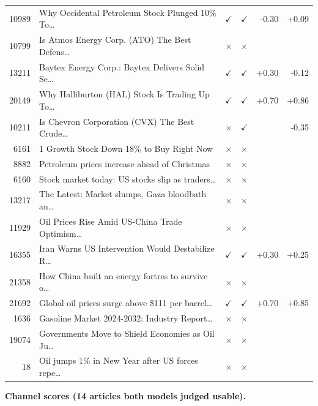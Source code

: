 \begin{footnotesize}
\begin{longtable}{@{}rp{6.6cm}ccrr@{}}
  10989 & Why Occidental Petroleum Stock Plunged 10\% To\ldots & $\checkmark$ & $\checkmark$ & -0.30 & +0.09 \\
  10799 & Is Atmos Energy Corp. (ATO) The Best Defens\ldots & $\times$ & $\times$ & & \\
  13211 & Baytex Energy Corp.: Baytex Delivers Solid Se\ldots & $\checkmark$ & $\checkmark$ & +0.30 & -0.12 \\
  20149 & Why Halliburton (HAL) Stock Is Trading Up To\ldots & $\checkmark$ & $\checkmark$ & +0.70 & +0.86 \\
  10211 & Is Chevron Corporation (CVX) The Best Crude\ldots & $\times$ & $\checkmark$ & & -0.35 \\
  6161 & 1 Growth Stock Down 18\% to Buy Right Now & $\times$ & $\times$ & & \\
  8882 & Petroleum prices increase ahead of Christmas & $\times$ & $\times$ & & \\
  6160 & Stock market today: US stocks slip as traders\ldots & $\times$ & $\times$ & & \\
  13217 & The Latest: Market slumps, Gaza bloodbath an\ldots & $\times$ & $\times$ & & \\
  11929 & Oil Prices Rise Amid US-China Trade Optimism\ldots & $\times$ & $\times$ & & \\
  16355 & Iran Warns US Intervention Would Destabilize R\ldots & $\checkmark$ & $\checkmark$ & +0.30 & +0.25 \\
  21358 & How China built an energy fortres to survive o\ldots & $\times$ & $\times$ & & \\
  21692 & Global oil prices surge above \$111 per barrel\ldots & $\checkmark$ & $\checkmark$ & +0.70 & +0.85 \\
  1636 & Gasoline Market 2024-2032: Industry Report\ldots & $\times$ & $\times$ & & \\
  19074 & Governments Move to Shield Economies as Oil Ju\ldots & $\times$ & $\times$ & & \\
  18 & Oil jumps 1\% in New Year after US forces repe\ldots & $\times$ & $\times$ & & \\
\end{longtable}
\end{footnotesize}

\textbf{Channel scores (14 articles both models judged usable).}

